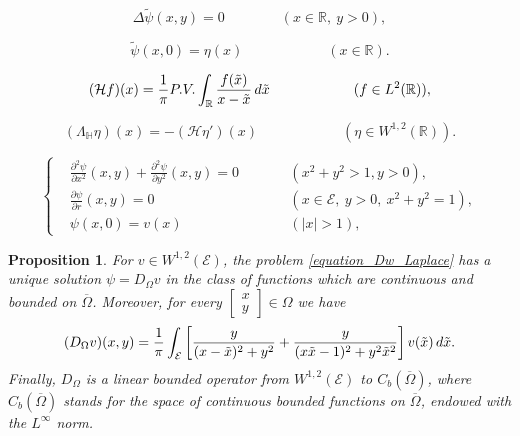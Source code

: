 \documentclass[10pt,a4paper]{amsart}
\newtheorem{proposition}{Proposition}
\begin{document}
\begin{equation}\label{Diri_tot}
\Delta \tilde \psi(x,y)=0 \qquad\qquad(x\in \mathbb{R},\ y>0),
\end{equation}

\begin{equation}\label{frontiera_tot}
\tilde\psi(x,0)=\eta(x) \qquad\qquad\qquad(x\in \mathbb{R}).
\end{equation}

\begin{equation}\label{prima_parte_finita}
(\mathcal{H} f)(x)=\frac1\pi  {\rm P.V.} \int_\mathbb{R} \frac{f(\tilde x)}{x- \tilde x}\, {\rm d}\tilde x
\qquad\qquad\qquad(f\in L^2(\mathbb{R})),
\end{equation}

\begin{equation}\label{cu_Hilbert}
(\Lambda_\mathbb{H}\eta)(x)=-(\mathcal{H}\eta')(x) \qquad\qquad\qquad(\eta\in W^{1,2}(\mathbb{R})).
\end{equation}

\begin{equation}\label{equation_Dw_Laplace}
\left\{
\begin{aligned}
&\frac{\partial^2\psi}{\partial x^2}(x,y) + \frac{\partial^2\psi}{\partial y^2}(x,y) =0 && \qquad(x^2+y^2>1, y>0),\\
&\frac{\partial\psi}{\partial r}(x,y)=0 && \qquad (x\in \mathcal{E},\ y>0,\ x^2+y^2=1),\\
&\psi(x,0)=v(x) &&\qquad (|x|>1),
\end{aligned}
\right.
\end{equation}

\begin{proposition}\label{21}
For  $v\in W^{1,2}(\mathcal{E})$, the problem \eqref{equation_Dw_Laplace} has a unique solution $\psi=D_\Omega v$ in the class of functions which are continuous and bounded on $\overline\Omega$. Moreover,
  for every  $\begin{bmatrix} x\\ y\end{bmatrix}\in \Omega$  we have
\begin{equation}\label{explicit_formula_Dv}
    (D_\Omega v)(x,y)=
    \frac{1}{\pi}\int_{\mathcal{E}}\left[\frac{y}{( x-\tilde x)^2+y^2}+\frac{y}{(x\tilde x-1)^2+y^2\tilde x^2}\right]v(\tilde x)\,{\rm d}\tilde x .
\end{equation}
Finally, $D_\Omega$ is a linear bounded operator from $W^{1,2}(\mathcal{E})$ to $C_b(\overline\Omega)$, where $C_b(\overline{\Omega})$
stands for the space of continuous bounded functions on $\overline{\Omega}$, endowed with the $L^\infty$ norm.
\end{proposition}
\end{document}
